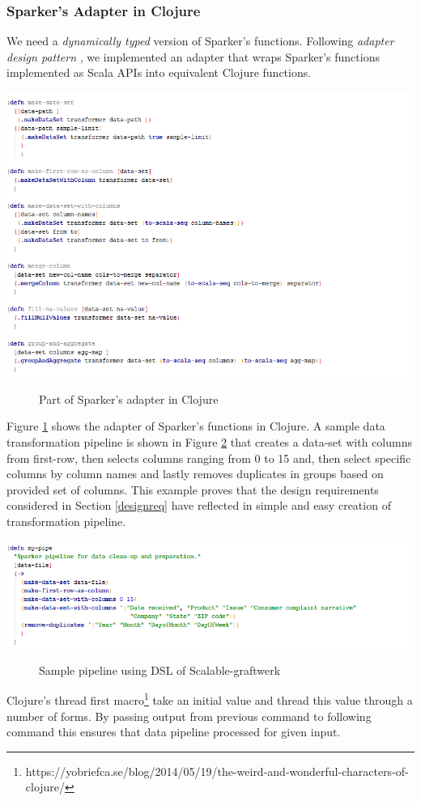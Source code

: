 \subsubsection{Sparker's Adapter in Clojure}
We need a \textit{dynamically typed} version of Sparker's functions. Following \textit{adapter design pattern} , we implemented an adapter that wraps Sparker's functions implemented as Scala APIs into equivalent Clojure functions. 
\begin{center}
\includegraphics[width=36em]{./Figures/wrapper}
\begin{figure}[htbp]
\caption{Part of Sparker's adapter in Clojure}
\label{fig:wrapper}
\end{figure}
\end{center}
Figure \ref{fig:wrapper} shows the adapter of Sparker's functions in Clojure. A sample data transformation pipeline is shown in Figure \ref{fig:sample-pipeline} that creates a data-set with columns from first-row, then selects columns ranging from 0 to 15 and, then select specific columns by column names and lastly removes duplicates in groups based on provided set of columns. This example proves that the design requirements considered in Section \ref{designreq} have reflected in simple and easy creation of transformation pipeline. 
\begin{center}
\includegraphics[width=36em]{./Figures/sample-pipeline}
\begin{figure}[htbp]
\caption{Sample pipeline using DSL of Scalable-graftwerk}
\label{fig:sample-pipeline}
\end{figure}
\end{center}
Clojure's thread first macro\footnote{https://yobriefca.se/blog/2014/05/19/the-weird-and-wonderful-characters-of-clojure/} take an initial value and thread this value through a number of forms. By passing output from previous command to following command this ensures that data pipeline processed for given input. 
